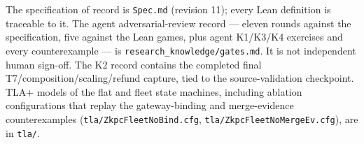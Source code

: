 \documentclass[9pt]{extarticle}
\begin{document}
The specification of record is \texttt{Spec.md} (revision 11); every Lean
definition is traceable to it. The agent adversarial-review record --- eleven
rounds against the specification, five against the Lean games, plus agent
K1/K3/K4 exercises and every counterexample --- is
\texttt{research\_knowledge/gates.md}. It is not independent human sign-off.
The K2 record contains the completed final
T7/composition/scaling/refund capture, tied to the source-validation
checkpoint. TLA+
models of the flat and fleet state machines, including ablation
configurations that replay the gateway-binding and merge-evidence
counterexamples (\texttt{tla/ZkpcFleetNoBind.cfg},
\texttt{tla/ZkpcFleetNoMergeEv.cfg}), are in \texttt{tla/}.

\begingroup
\small
\begingroup
\small


\endgroup
\endgroup
\end{document}
